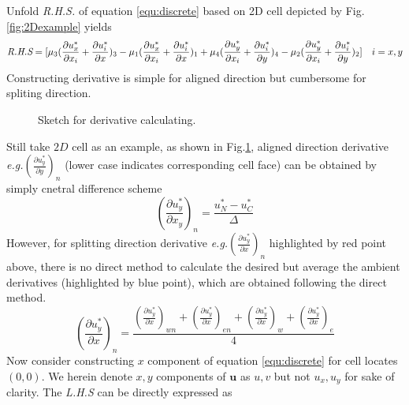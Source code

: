 \documentclass[a4paper]{article}
\begin{document}
Unfold \emph{R.H.S.} of equation \ref{equ:discrete} based on 2D cell depicted by Fig.\ref{fig:2Dexample} yields
\begin{equation}\label{equ:2dunfold}
    \emph{R.H.S} = [\mu_3(\frac{\partial u^*_x}{\partial x_i}+\frac{\partial u^*_i}{\partial x})_3 - \mu_1(\frac{\partial u^*_x}{\partial x_i}+\frac{\partial u^*_i}{\partial x})_1+\mu_4(\frac{\partial u^*_y}{\partial x_i}+\frac{\partial u^*_i}{\partial y})_4-\mu_2(\frac{\partial u^*_y}{\partial x_i}+\frac{\partial u^*_i}{\partial y})_2]\quad i = x,y
\end{equation}
 Constructing derivative is simple for aligned direction but cumbersome for spliting direction.
\begin{figure}[H]
    \centering
    \caption{Sketch for derivative calculating.}
    \label{fig:2Dcelld}
\end{figure}
Still take $2D$ cell as an example, as shown in Fig.\ref{fig:2Dcelld}, aligned direction derivative \emph{e.g.}$(\frac{\partial u^*_y}{\partial y})_n$ (lower case indicates corresponding cell face) can be obtained by simply cnetral difference scheme
\begin{equation}
  (\frac{\partial u^*_y}{\partial x_y})_n = \frac{u^*_N-u^*_C}{\Delta}
\end{equation}
However, for splitting direction derivative \emph{e.g.}$(\frac{\partial u^*_y}{\partial x})_n$ highlighted by red point above, there is no direct method to calculate the desired but average the ambient derivatives (highlighted by blue point), which are obtained following the direct method.
\begin{equation}
  (\frac{\partial u^*_y}{\partial x})_n = \frac{ ( \frac{\partial u^*_y}{\partial x})_{wn}+( \frac{\partial u^*_y}{\partial x})_{en}+( \frac{\partial u^*_y}{\partial x})_{w}+( \frac{\partial u^*_y}{\partial x})_{e}}{4}
\end{equation}
Now consider constructing $x$ component of equation \ref{equ:discrete} for cell locates $(0,0)$. We herein denote $x,y$ components of $ \mathbf{u}$ as $u,v$ but not $u_x,u_y$ for sake of clarity. The \emph{L.H.S} can be directly expressed as 
\end{document}
